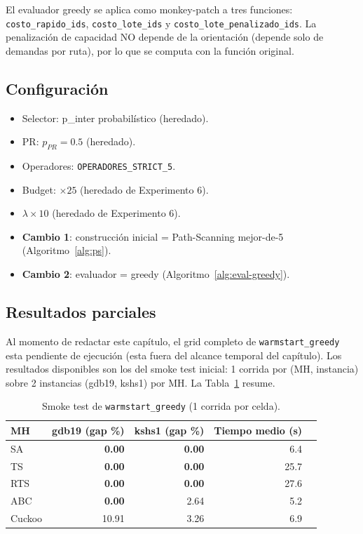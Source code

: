 \documentclass[11pt,a4paper]{article}
\theoremstyle{definition}
\theoremstyle{remark}
\begin{document}
El evaluador greedy se aplica como monkey-patch a tres funciones:
\texttt{costo\_rapido\_ids}, \texttt{costo\_lote\_ids} y
\texttt{costo\_lote\_penalizado\_ids}. La penalización de capacidad NO
depende de la orientación (depende solo de demandas por ruta), por lo
que se computa con la función original.

\subsection{Configuración}

\begin{itemize}
\item Selector: p\_inter probabilístico (heredado).
\item PR: $p_{PR} = 0.5$ (heredado).
\item Operadores: \texttt{OPERADORES\_STRICT\_5}.
\item Budget: $\times 25$ (heredado de Experimento 6).
\item $\lambda \times 10$ (heredado de Experimento 6).
\item \textbf{Cambio 1}: construcción inicial = Path-Scanning
  mejor-de-5 (Algoritmo~\ref{alg:ps}).
\item \textbf{Cambio 2}: evaluador = greedy
  (Algoritmo~\ref{alg:eval-greedy}).
\end{itemize}

\subsection{Resultados parciales}

Al momento de redactar este capítulo, el grid completo de
\texttt{warmstart\_greedy} esta pendiente de ejecución (esta fuera del
alcance temporal del capítulo). Los resultados disponibles son los del
smoke test inicial: 1 corrida por (MH, instancia) sobre 2 instancias
(gdb19, kshs1) por MH. La Tabla~\ref{tab:wsgreedy-smoke} resume.

\begin{table}[h]
\centering
\caption{Smoke test de \texttt{warmstart\_greedy} (1 corrida por celda).}
\label{tab:wsgreedy-smoke}
\small
\begin{tabular}{lrrrr}
\toprule
MH & gdb19 (gap \%) & kshs1 (gap \%) & Tiempo medio (s) \\
\midrule
SA      & \textbf{0.00} & \textbf{0.00} &  6.4 \\
TS      & \textbf{0.00} & \textbf{0.00} & 25.7 \\
RTS     & \textbf{0.00} & \textbf{0.00} & 27.6 \\
ABC     & \textbf{0.00} & 2.64 &  5.2 \\
Cuckoo  & 10.91 & 3.26 &  6.9 \\
\bottomrule
\end{tabular}
\end{table}
\end{document}
